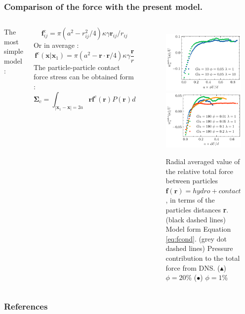 \documentclass{sintefbeamer}
\begin{document}
\begin{frame}
  \frametitle{Comparison of the force with the present model. }
  \begin{columns}
    The most simple model : 
  
    \begin{equation*}
      \textbf{f}_{ij}^\text{c}
      = \pi (a^2 - r_{ij}^2/4) \kappa \gamma  \textbf{r}_{ij}/r_{ij}
    \end{equation*} 
    Or in average : 
    \begin{equation}
      \textbf{f}^c(\textbf{x}| \textbf{x}_1)
      = \pi (a^2 - \textbf{r}\cdot\textbf{r}/4) \kappa \gamma 
      \frac{\textbf{r}}{r}
      \label{eq:fcond}
    \end{equation} 
    The particle-particle contact force stress can be obtained form : 
    \begin{equation*}
      \bm\Sigma_c 
      =\int_{|\textbf{x}_1 - \textbf{x}| = 2a}
      \textbf{r} \textbf{f}^c(\textbf{r}) P(\textbf{r}) d\textbf{}
    \end{equation*}


    \begin{figure}
      \includegraphics[height=0.4\textwidth]{image/HOMOGENEOUS_NEW/Capilary_force_l_1_Ga_10.pdf}
      \includegraphics[height=0.4\textwidth]{image/HOMOGENEOUS_NEW/Capilary_force_l_1_Ga_100.pdf}
      \caption{Radial averaged value of the relative total force between particles $\textbf{f}(\textbf{r}) = hydro+contact$, in terms of the particles distances \textbf{r}.
      (black dashed lines) Model form Equation \ref{eq:fcond}. 
      (grey dot dashed lines) Pressure contribution to the total force from DNS. 
      ($\blacktriangle$) $\phi = 20$\% 
      ($\bullet$) $\phi = 1$\%} 
    \end{figure}

  \end{columns}


\end{frame}

\begin{frame}[t]
  \frametitle{References}
  
\end{frame}
\end{document}
